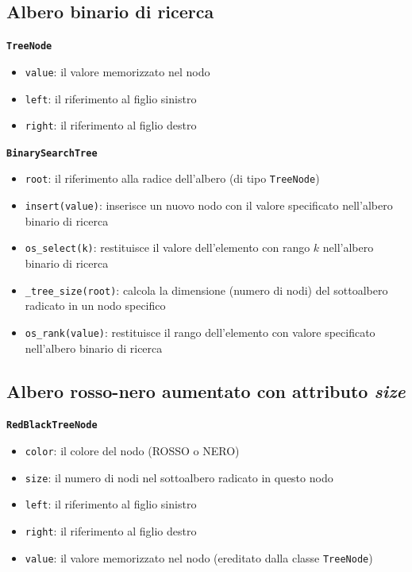 \documentclass[onecolumn]{article}
\begin{document}
\subsection{Albero binario di ricerca}
\texttt{\textbf{TreeNode}}
\begin{itemize}
\setlength\itemsep{0em}
    \item \verb|value|: il valore memorizzato nel nodo
    \item \verb|left|: il riferimento al figlio sinistro
    \item \verb|right|: il riferimento al figlio destro
\end{itemize}

{\setlength{\parindent}{0em} \texttt{\textbf{BinarySearchTree}}}
\begin{itemize}
\setlength\itemsep{0em}
    \item \verb|root|: il riferimento alla radice dell'albero (di tipo \texttt{TreeNode})
    \item \verb|insert(value)|: inserisce un nuovo nodo con il valore specificato nell'albero binario di ricerca
    \item \verb|os_select(k)|: restituisce il valore dell'elemento con rango $k$ nell'albero binario di ricerca
    \item \verb|_tree_size(root)|: calcola la dimensione (numero di nodi) del sottoalbero radicato in un nodo specifico
    \item \verb|os_rank(value)|: restituisce il rango dell'elemento con valore specificato nell'albero binario di ricerca
\end{itemize}

\subsection{Albero rosso-nero aumentato con attributo \textit{size}}
\texttt{\textbf{RedBlackTreeNode}}
\begin{itemize}
\setlength\itemsep{0em}
    \item \verb|color|: il colore del nodo (ROSSO o NERO)
    \item \verb|size|: il numero di nodi nel sottoalbero radicato in questo nodo
    \item \verb|left|: il riferimento al figlio sinistro
    \item \verb|right|: il riferimento al figlio destro
    \item \verb|value|: il valore memorizzato nel nodo (ereditato dalla classe \texttt{TreeNode})
\end{itemize}
\end{document}
